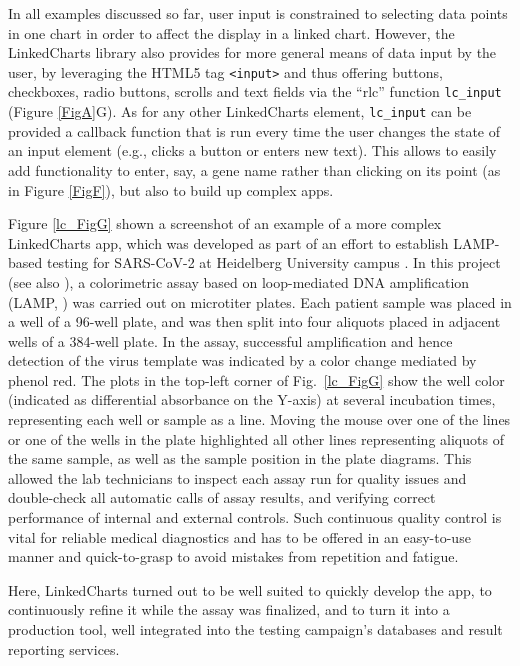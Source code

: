 \documentclass[twocolumn,10pt]{article}
\begin{document}
In all examples discussed so far, user input is constrained to selecting data points in one chart in order to affect the display in a linked chart. However, the LinkedCharts library also provides for more general means of data input by the user, by leveraging the HTML5 tag \texttt{<input>} and thus offering buttons, checkboxes, radio buttons, scrolls and text fields via the ``rlc'' function \texttt{lc_input} (Figure \ref{FigA}G). As for any other LinkedCharts element, \texttt{lc_input} can be provided a callback function that is run every time the user changes the state of an input element (e.g., clicks a button or enters new text). This allows to easily add functionality to enter, say, a gene name rather than clicking on its point (as in Figure \ref{FigF}), but also to build up complex apps.

Figure \ref{lc_FigG} shown a screenshot of an example of a more complex LinkedCharts app, which was developed as part of an effort to establish LAMP-based testing for SARS-CoV-2 at Heidelberg University campus \citep{daothi_2020}. In this project (see also \citep{herbst_2021}), a colorimetric assay based on loop-mediated DNA amplification (LAMP, \citep{notomi_2000}) was carried out on microtiter plates. Each patient sample was placed in a well of a 96-well plate, and was then split into four aliquots placed in adjacent wells of a 384-well plate. In the assay, successful amplification  and hence detection of the virus template was indicated by a color change mediated by phenol red. The plots in the top-left corner of Fig.\ \ref{lc_FigG} show the well color (indicated as differential absorbance on the Y-axis) at several incubation times, representing each well or sample as a line. Moving the mouse over one of the lines or one of the wells in the plate highlighted all other lines representing aliquots of the same sample, as well as the sample position in the plate diagrams. This allowed the lab technicians to inspect each assay run for quality issues and double-check all automatic calls of assay results, and verifying correct performance of internal and external controls. Such continuous quality control is vital for reliable medical diagnostics and has to be offered in an easy-to-use manner and quick-to-grasp to avoid mistakes from repetition and fatigue.

Here, LinkedCharts turned out to be well suited to quickly develop the app, to continuously refine it while the assay was finalized, and to turn it into a production tool, well integrated into the testing campaign's databases and result reporting services.
\end{document}
